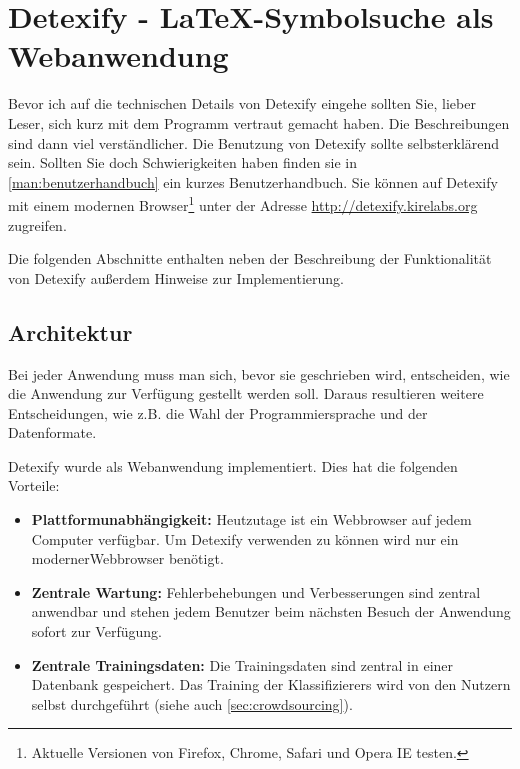 \chapter[Detexify]{Detexify - \LaTeX-Symbolsuche als Webanwendung} %
\label{cha:detexify}

Bevor ich auf die technischen Details von Detexify eingehe sollten Sie, lieber Leser, sich kurz mit dem Programm vertraut gemacht haben. Die Beschreibungen sind dann viel verständlicher. Die Benutzung von Detexify sollte selbsterklärend sein. Sollten Sie doch Schwierigkeiten haben finden sie in \ref{man:benutzerhandbuch} ein kurzes Benutzerhandbuch. Sie können auf Detexify mit einem modernen Browser\footnote{Aktuelle Versionen von Firefox, Chrome, Safari und Opera \TODO IE testen.} unter der Adresse \url{http://detexify.kirelabs.org} zugreifen.

Die folgenden Abschnitte enthalten neben der Beschreibung der Funktionalität von Detexify außerdem Hinweise zur Implementierung.

\section{Architektur} %
\label{sec:architektur}

Bei jeder Anwendung muss man sich, bevor sie geschrieben wird, entscheiden, wie die Anwendung zur Verfügung gestellt werden soll. Daraus resultieren weitere Entscheidungen, wie z.B. die Wahl der Programmiersprache und der Datenformate.

Detexify wurde als Webanwendung implementiert. Dies hat die folgenden Vorteile:

\begin{itemize}
  \item \textbf{Plattformunabhängigkeit:} Heutzutage ist ein Webbrowser auf jedem Computer verfügbar. Um Detexify verwenden zu können wird nur ein moderner\footnotemark[1] Webbrowser benötigt.
  \item \textbf{Zentrale Wartung:} Fehlerbehebungen und Verbesserungen sind zentral anwendbar und stehen jedem Benutzer beim nächsten Besuch der Anwendung sofort zur Verfügung.
  \item \textbf{Zentrale Trainingsdaten:} Die Trainingsdaten sind zentral in einer Datenbank gespeichert. Das Training der Klassifizierers wird von den Nutzern selbst durchgeführt (siehe auch \ref{sec:crowdsourcing}).
\end{itemize}

